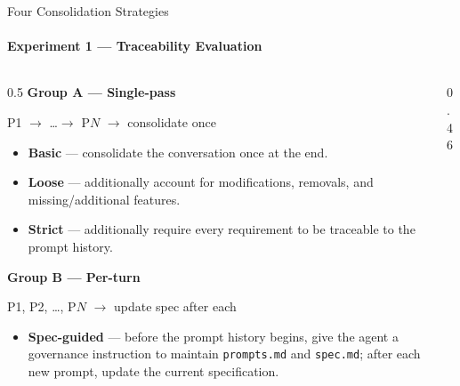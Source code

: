 \documentclass[aspectratio=169,11pt,c]{beamer}
\begin{document}
\begin{frame}{Four Consolidation Strategies}
  \framesubtitle{Experiment 1 --- Traceability Evaluation}
  \begin{columns}[T]
    \begin{column}{0.5\textwidth}
      {\small\bfseries\color{inkgray}Group A --- Single-pass}
      {\scriptsize\color{midgray}\quad P1 $\to$ \dots $\to$ P$N$ $\to$ consolidate once\par}
      \begin{itemize}\scriptsize
        \item \textbf{Basic} --- consolidate the conversation once at the end.
        \item \textbf{Loose} --- additionally account for modifications, removals, and missing/additional features.
        \item \textbf{Strict} --- additionally require every requirement to be traceable to the prompt history.
      \end{itemize}
      \vspace{2pt}
      {\small\bfseries\color{inkgray}Group B --- Per-turn}
      {\scriptsize\color{midgray}\quad P1, P2, \dots, P$N$ $\to$ update spec after each\par}
      \begin{itemize}\scriptsize
        \item \textbf{Spec-guided} --- before the prompt history begins, give the agent a governance instruction to maintain \texttt{prompts.md} and \texttt{spec.md}; after each new prompt, update the current specification.
      \end{itemize}
    \end{column}
    \begin{column}{0.46\textwidth}
      \begin{center}
      \end{center}
    \end{column}
  \end{columns}
\end{frame}
\end{document}
